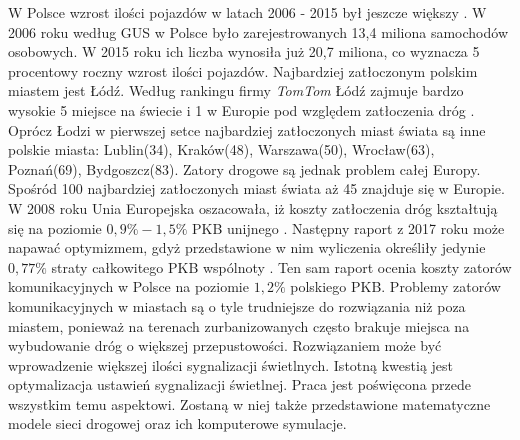 \documentclass[12pt]{book}
\theoremstyle{plain}
\begin{document}
W Polsce wzrost ilości pojazdów w latach 2006 - 2015 był jeszcze większy \cite{liczbaPojazdowPolska}. W 2006 roku według GUS w Polsce było zarejestrowanych 13,4 miliona samochodów osobowych. W 2015 roku ich liczba wynosiła już 20,7 miliona, co wyznacza 5 procentowy roczny wzrost ilości pojazdów.
Najbardziej zatłoczonym polskim miastem jest Łódź. Według rankingu firmy \textit{TomTom } Łódź zajmuje bardzo wysokie 5 miejsce na świecie i 1 w Europie pod względem zatłoczenia dróg \cite{rankingTomTom}. Oprócz Łodzi w pierwszej setce najbardziej zatłoczonych miast świata są inne polskie miasta: Lublin(34), Kraków(48), Warszawa(50), Wrocław(63), Poznań(69), Bydgoszcz(83). Zatory drogowe są jednak problem całej Europy. Spośród 100 najbardziej zatłoczonych miast świata aż 45 znajduje się w Europie. W 2008 roku Unia Europejska oszacowała, iż koszty zatłoczenia dróg kształtują się na poziomie $0,9\%-1,5\%$ PKB unijnego \cite{ue2008}. Następny raport z 2017 roku może napawać optymizmem, gdyż przedstawione w nim wyliczenia określiły jedynie $0,77\%$ straty całkowitego PKB wspólnoty \cite{ue2017}. Ten sam raport ocenia koszty zatorów komunikacyjnych w Polsce na poziomie $1,2\%$ polskiego PKB.
Problemy zatorów komunikacyjnych w miastach są o tyle trudniejsze do rozwiązania niż poza miastem, ponieważ na terenach zurbanizowanych często brakuje miejsca na wybudowanie dróg o większej przepustowości. Rozwiązaniem może być wprowadzenie większej ilości sygnalizacji świetlnych. Istotną kwestią jest optymalizacja ustawień sygnalizacji świetlnej. Praca jest poświęcona przede wszystkim temu aspektowi. Zostaną w niej także przedstawione matematyczne modele sieci drogowej oraz ich komputerowe symulacje. 
%
\end{document}
